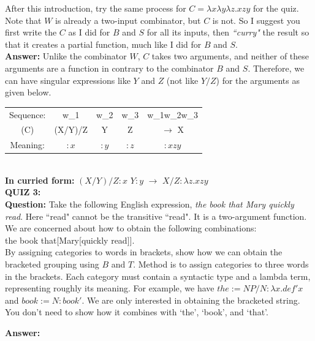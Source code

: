 \documentclass[12pt,a4paper]{article}
\begin{document}
After this introduction, try the same process for $C=\lambda x\lambda y\lambda z.xzy$ for the quiz. Note that $W$ is already a two-input combinator, but $C$ is not. So I suggest you first write the $C$ as I did for $B$ and $S$ for all its inputs, then \textit{``curry"} the result so that it creates a partial function, much like I did for $B$ and $S$.\\

\noindent \textbf{Answer:} Unlike the combinator $W$, $C$ takes two arguments, and neither of these arguments are a function in contrary to the combinator $B$ and $S$. Therefore, we can have singular expressions like $Y$ and $Z$ (not like $Y/Z$) for the arguments as given below.\\

\begin{tabular}{ccccc}
Sequence: & w_{1}   & w_{2} & w_{3} & w_{1}w_{2}w_{3}  \\
(C)       & (X/Y)/Z & Y   & Z     & $\rightarrow$ X     \\
Meaning:          & $:x$      & $:y$    & $:z$    & $:xzy$ \\ \hline
\end{tabular}\\

\textbf{In curried form:} $(X/Y)/Z:x$ $Y:y$ $\rightarrow$ $X/Z:\lambda z.xzy$\\

\textbf{\Large{QUIZ 3:}}\\

\textbf{Question:} Take the following English expression, \textit{the book that Mary quickly read}. Here ``read" cannot be the transitive ``read". It is a two-argument function. We are concerned about how to obtain the following combinations:\\

the book that[Mary[quickly read]].\\

\noindent By assigning categories to words in brackets, show how we can obtain the bracketed grouping using $B$ and $T$. Method is to assign categories to three words in the brackets. Each category must contain a syntactic type and a lambda term, representing roughly its meaning. For example, we have $the:=NP/N: \lambda x.def'x$ and $book:=N:book'$. We are only interested in obtaining the bracketed string. You don't need to show how it combines with `the', `book', and `that'.

\noindent \textbf{Answer:}\\
\end{document}
